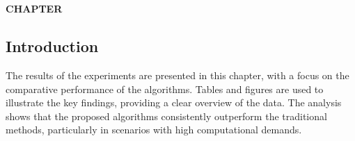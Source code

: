 \chapter*{}  %

\setcounter{chapter}{4}  %
\setcounter{section}{0}  %
\setcounter{subsection}{0}  %
\setcounter{subsubsection}{0}  %

\vspace*{-50mm}


\vspace*{10mm}  %

\begin{center}
    \textbf{CHAPTER \thechapter}\\
    \vspace{5mm}  %
    \textbf{\chapterFOURtopic}
\end{center}

\vspace{10mm}  %

\section{Introduction}
\setlength{\parindent}{1cm}  %

\begin{spacing}{2}  %

The results of the experiments are presented in this chapter, with a focus on the comparative performance of the algorithms. Tables and figures are used to illustrate the key findings, providing a clear overview of the data. The analysis shows that the proposed algorithms consistently outperform the traditional methods, particularly in scenarios with high computational demands.


\end{spacing}
